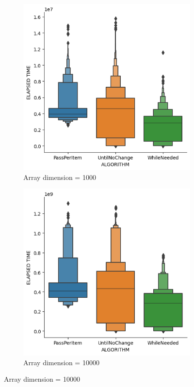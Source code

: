 \documentclass{article}
\begin{document}
\begin{figure}[H]
    \centering
    \begin{subfigure}[b]{0.4\textwidth}
        \centering
        \includegraphics[width=\textwidth]{./data/comparison_algorithm_1000.png}
        \caption{Array dimension = 1000}
    \end{subfigure}
    \hfill
    \begin{subfigure}[b]{0.4\textwidth}
        \centering
        \includegraphics[width=\textwidth]{./data/comparison_algorithm_10000.png}
        \caption{Array dimension = 10000}
    \end{subfigure}
\end{figure}
\end{document}
